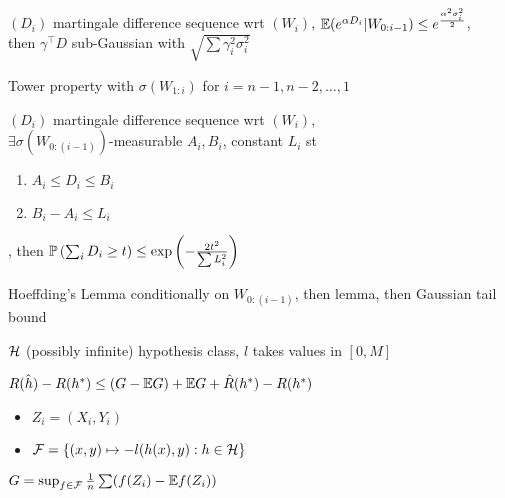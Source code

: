 \begin{lemma}
    $(D_i)$ martingale difference sequence wrt $(W_i)$, $\mathbb{E} (e^{\alpha D_i} | W_{0:{i-1}}) \leq e^{\frac{\alpha^2 \sigma_i^2}{2}}$, \\
    then $\gamma^\top D$ sub-Gaussian with $\sqrt{\sum \gamma_i^2 \sigma_i^2}$
\end{lemma}
\begin{pf}
    Tower property with $\sigma(W_{1:i})$ for $i=n-1, n-2, \dots, 1$
\end{pf}

\begin{thm}
    $(D_i)$ martingale difference sequence wrt $(W_i)$,\\ $\exists \sigma(W_{0:(i-1)})$-measurable $A_i, B_i$, constant $L_i$ st
    \begin{enumerate}
        \item $A_i \leq D_i \leq B_i$
        \item $B_i - A_i \leq L_i$
    \end{enumerate}, then $\mathbb{P}\left( \sum_i D_i \geq t \right) \leq \exp\left( - \frac{2t^2}{\sum L_i^2} \right)$
\end{thm}
\begin{pf}
    Hoeffding's Lemma conditionally on $W_{0:(i-1)}$, then lemma, then Gaussian tail bound
\end{pf}

\begin{setting}
    $\mathcal{H}$ (possibly infinite) hypothesis class, $l$ takes values in $[0, M]$
\end{setting}
\begin{fact}
    $R(\hat h) - R(h^*) \leq (G - \mathbb{E} G) + \mathbb{E} G + \hat R(h^*) - R(h^*)$
\end{fact}

\begin{itemize}
    \item $Z_i = (X_i, Y_i)$
    \item $\mathcal{F} = \left\{ (x,y) \mapsto -l(h(x), y) : h \in \mathcal{H} \right\}$
\end{itemize}
\begin{fact}
    $G = \sup_{f \in \mathcal{F}} \frac{1}{n} \sum (f(Z_i) - \mathbb{E} f(Z_i))$
\end{fact}

